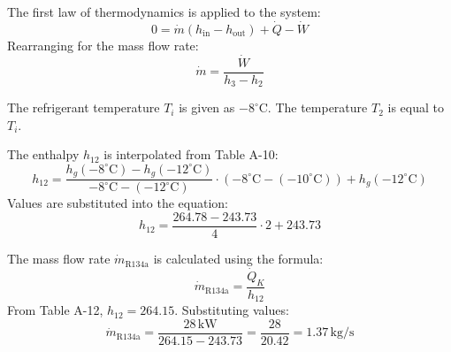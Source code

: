 The first law of thermodynamics is applied to the system:  
\[
0 = \dot{m} (h_{\text{in}} - h_{\text{out}}) + \dot{Q} - \dot{W}
\]  
Rearranging for the mass flow rate:  
\[
\dot{m} = \frac{\dot{W}}{h_3 - h_2}
\]

The refrigerant temperature \( T_i \) is given as \( -8^\circ\text{C} \).  
The temperature \( T_2 \) is equal to \( T_i \).  

The enthalpy \( h_{12} \) is interpolated from Table A-10:  
\[
h_{12} = \frac{h_g(-8^\circ\text{C}) - h_g(-12^\circ\text{C})}{-8^\circ\text{C} - (-12^\circ\text{C})} \cdot (-8^\circ\text{C} - (-10^\circ\text{C})) + h_g(-12^\circ\text{C})
\]  
Values are substituted into the equation:  
\[
h_{12} = \frac{264.78 - 243.73}{4} \cdot 2 + 243.73
\]  

The mass flow rate \( \dot{m}_{\text{R134a}} \) is calculated using the formula:  
\[
\dot{m}_{\text{R134a}} = \frac{\dot{Q}_K}{h_{12}}
\]  
From Table A-12, \( h_{12} = 264.15 \). Substituting values:  
\[
\dot{m}_{\text{R134a}} = \frac{28 \, \text{kW}}{264.15 - 243.73} = \frac{28}{20.42} = 1.37 \, \text{kg/s}
\]